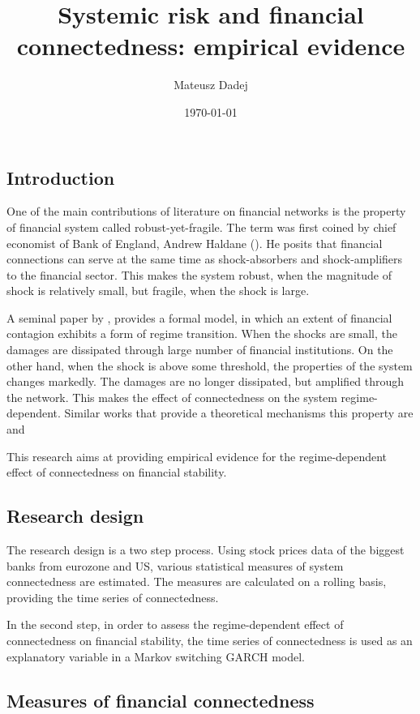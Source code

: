 \documentclass{article}
\title{Systemic risk and financial connectedness: empirical evidence}
\author{Mateusz Dadej}
\date{\today}
\begin{document}
\maketitle

\subsection*{Introduction}

One of the main contributions of literature on financial networks is the property of financial system called robust-yet-fragile. The term was first coined by chief economist of Bank of England, Andrew Haldane (\citet{haldane}). He posits that financial connections can serve at
the same time as shock-absorbers and shock-amplifiers to the financial sector. This makes the system robust, when the magnitude of shock is relatively small, but fragile, when the shock is large. 

A seminal paper by \citet{acemoglu}, provides a formal model, in which an extent of financial contagion exhibits a form of regime transition. When the shocks are small, the damages are dissipated through large number of financial institutions. On the other hand, when the shock is above some threshold, the properties of the system changes markedly. The damages are no longer dissipated, but amplified through the network. This makes the effect of connectedness on the system regime-dependent. Similar works that provide a theoretical mechanisms this property are \citet{callaway} and \citet{gai}

This research aims at providing empirical evidence for the regime-dependent effect of connectedness on financial stability. 

\subsection*{Research design}

The research design is a two step process. Using stock prices data of the biggest banks from eurozone and US, various statistical measures of system connectedness are estimated. The measures are calculated on a rolling basis, providing the time series of connectedness. 

In the second step, in order to assess the regime-dependent effect of connectedness on financial stability, the time series of connectedness is used as an explanatory variable in a Markov switching GARCH model.

\subsection*{Measures of financial connectedness}
\end{document}
